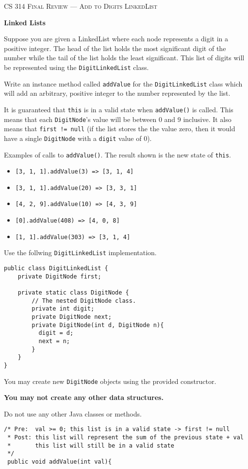 \documentclass[12pt,letter]{article}
\begin{document}
\noindent\textsc{\large CS 314 Final Review --- Add to Digits LinkedList}

\vspace{6pt}
\noindent\textbf{Linked Lists}

\vspace{2pt}
\noindent Suppose you are given a LinkedList where each node represents a digit in a positive integer. The head of the list holds the most significant digit
of the number while the tail of the list holds the least significant. This list of digits will be represented using the \texttt{DigitLinkedList} class.

\vspace{2pt}
\noindent Write an instance method called \texttt{addValue} for the \texttt{DigitLinkedList} class which will add an arbitrary, 
positive integer to the number represented by the list.

\vspace{2pt}
\noindent It is guaranteed that \texttt{this} is in a valid state when \texttt{addValue()} is called. This means that each \texttt{DigitNode}'s value will
be between 0 and 9 inclusive. It also means that \texttt{first != null} (if the list stores the the value zero, then it would have a single \texttt{DigitNode} with
a \texttt{digit} value of 0).

\noindent Examples of calls to \texttt{addValue()}. The result shown is the new state of \texttt{this}.
\begin{itemize}
  \item \texttt{[3, 1, 1].addValue(3) => [3, 1, 4]}
  \item \texttt{[3, 1, 1].addValue(20) => [3, 3, 1]}
  \item \texttt{[4, 2, 9].addValue(10) => [4, 3, 9]}
  \item \texttt{[0].addValue(408) => [4, 0, 8]}
  \item \texttt{[1, 1].addValue(303) => [3, 1, 4]}
\end{itemize}

\vspace{6pt}
\noindent Use the follwing \texttt{DigitLinkedList} implementation.
\begin{verbatim}
public class DigitLinkedList {
    private DigitNode first;

    private static class DigitNode {
        // The nested DigitNode class.
        private int digit;
        private DigitNode next;
        private DigitNode(int d, DigitNode n){
          digit = d;
          next = n;
        }
    }
}
\end{verbatim}

\noindent You may create new \texttt{DigitNode} objects using the provided constructor.

\noindent \textbf{You may not create any other data structures.}

\noindent Do not use any other Java classes or methods.

\clearpage
\begin{verbatim}
/* Pre:  val >= 0; this list is in a valid state -> first != null
 * Post: this list will represent the sum of the previous state + val
 *       this list will still be in a valid state
 */
 public void addValue(int val){
\end{verbatim}
\end{document}
